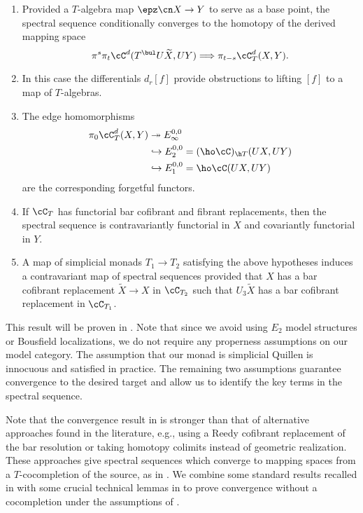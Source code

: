 \documentclass[leqno,oneside,english]{elsarticle}
\newcounter{enumisaved}
\begin{document}
\begin{thmA}
\begin{enumerate}
{{{  }
  \setcounter{enumi}{\theenumisaved}
    \else  \fi
}}{}    \item Provided a $T$-algebra map $\epz \cn X \to Y$ to serve as a
      base point, the spectral sequence conditionally converges to the
      homotopy of the derived mapping space
      \[
      \pi^s \pi_t \cC^d(T^{\bul}U\widetilde{X}, UY)\Longrightarrow \pi_{t-s}\cC_T^d(X,Y).
      \]
     \item In this case the differentials $d_r[f]$ provide obstructions to
       lifting $[f]$ to a map of $T$-algebras.
     \item The edge homomorphisms 
       \begin{align*}
	 \pi_0 \cC_T^d(X,Y)
	 &\twoheadrightarrow E_\infty^{0,0}\\
	 &\hookrightarrow E_2^{0,0} = (\ho\cC)_{\h T}(UX, UY)\\
	 &\hookrightarrow E_1^{0,0} = \ho\cC (UX, UY)
       \end{align*}
       are the corresponding forgetful functors.
       \item   If $\cC_T$ has functorial bar cofibrant and fibrant replacements, then the spectral sequence is contravariantly functorial in $X$ and covariantly functorial in $Y$.
       \item   A map of simplicial monads $T_1\rightarrow T_2$ satisfying the above hypotheses induces a contravariant map of spectral sequences provided that $X$ has a bar cofibrant replacement $\widetilde{X} \to X$ in $\cC_{T_2}$ such that $U_3 \widetilde{X}$ has a bar cofibrant replacement in $\cC_{T_1}$.
       \end{enumerate}
\end{thmA}
This result will be proven in . Note that since we
avoid using $E_2$ model structures or Bousfield localizations, we do
not require any properness assumptions on our model category. The
assumption that our monad is simplicial Quillen is innocuous and satisfied in 
practice. The remaining two assumptions guarantee convergence to the
desired target and allow us to identify the key terms in the spectral
sequence. 

Note that the convergence result in   is stronger than that of
alternative approaches found in the literature, e.g., using a Reedy
cofibrant replacement of the bar resolution or taking homotopy colimits
instead of geometric realization.  These approaches give spectral
sequences which converge to mapping spaces from a $T$-cocompletion of
the source, as in \cite{Hes10,BR12}. We combine some standard results
recalled in  with some crucial 
technical lemmas in  to prove convergence without a
cocompletion under the assumptions of .
\end{document}
